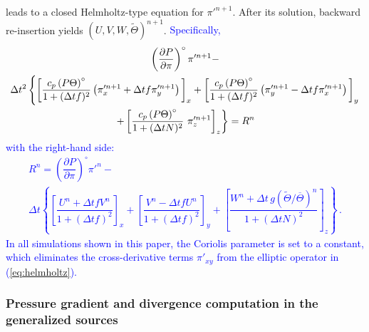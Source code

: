\documentclass{ametsoc}
\theoremstyle{definition}
\newcommand{\klein}[1]{\textcolor{blue}{#1}}
\newcommand{\eq}[1]{(\ref{#1})}
\newcommand{\dt}{\Delta t}
\newcommand{\Thetabar}{\overline{\Theta}}
\newcommand{\Thetatilde}{{\widetilde \Theta}}
\begin{document}
leads to a closed Helmholtz-type equation for ${\pi'}^{n+1}$. After its 
solution, backward re-insertion yields $(U, V, W, \Thetatilde)^{n+1}$. 
\klein{Specifically, 
%
 \begin{multline}\label{eq:helmholtz}
 \left(\dfrac{\partial P}{\partial\pi}\right)^{\circ}\pi'^{n+1} - \\
\dt^2 
\left\{ 
      \left[
        \dfrac{c_p \left(P\Theta\right)^{\circ}}{1+(\dt f)^2} 
          \left(\pi'^{n+1}_x+\dt f\pi'^{n+1}_y
          \right)
        \rule{0pt}{12pt}\right]_x
       +\left[
          \dfrac{c_p \left(P\Theta\right)^{\circ}}{1+(\dt f)^2} 
            \left(\pi'^{n+1}_y-\dt f\pi'^{n+1}_x
            \right)
         \rule{0pt}{12pt}\right]_y
    \right.\\
    \left.
  + \left[\dfrac{c_p \left(P\Theta\right)^{\circ}}{1+(\dt N)^2} \ \pi'^{n+1}_z
      \rule{0pt}{12pt}\right]_z
    \right\}
  = R^n
 \end{multline}
%
with the right-hand side:
%
\begin{multline}\label{eq:helmholtz_rhs}
R^n=\left(\dfrac{\partial P}{\partial\pi}\right)^{\circ}\pi'^n-\\
\dt
\left\{
\left[\dfrac{U^n +\dt f V^n}{1+(\dt f)^2}\right]_x  
+ \left[\dfrac{V^n - \dt f U^n}{1+(\dt f)^2}\right]_y
+\left[\dfrac{W^n+\dt\, g\left(\Thetatilde/\Thetabar\right)^n}{1+(\dt N)^2}\right]_z\right\} \,.
\end{multline}
%
In all simulations shown in this paper, the Coriolis parameter is set to a
constant, which eliminates the cross-derivative terms $\pi'_{xy}$ from
the elliptic operator in \eq{eq:helmholtz}.}


\subsubsection{Pressure gradient and divergence computation in the generalized sources}
\label{sssec:NodalDiscretization}
\end{document}

